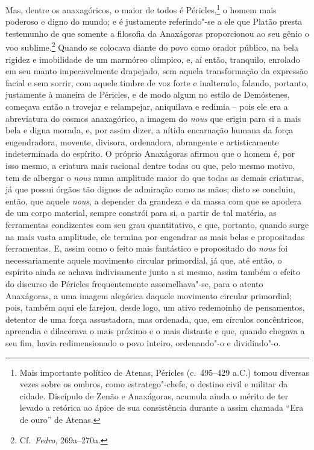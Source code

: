 Mas, dentre os anaxagóricos, o maior de todos é Péricles,\footnote{ Mais
importante político de Atenas, Péricles (c.~495--429 a.C.) tomou
diversas vezes sobre os ombros, como estratego"-chefe, o destino civil e
militar da cidade. Discípulo de Zenão e Anaxágoras, acumula ainda o
mérito de ter levado a retórica ao ápice de sua consistência durante a
assim chamada ``Era de ouro'' de Atenas.} o homem mais poderoso e
digno do mundo; e é justamente referindo"-se a ele que Platão presta
testemunho de que somente a filosofia da Anaxágoras proporcionou ao seu
gênio o voo sublime.\footnote{ Cf.~\textit{Fedro}, 269a--270a.} 
Quando se colocava diante do povo como orador público, na bela
rigidez e imobilidade de um marmóreo olímpico, e, aí então, tranquilo,
enrolado em seu manto impecavelmente drapejado, sem aquela
transformação da expressão facial e sem sorrir, com aquele timbre de
voz forte e inalterado, falando, portanto, justamente à maneira de
Péricles, e de modo algum no estilo de Demóstenes, começava então a
trovejar e relampejar, aniquilava e redimia -- pois ele era a
abreviatura do cosmos anaxagórico, a imagem do \textit{nous} que erigiu
para si a mais bela e digna morada, e, por assim dizer, a nítida
encarnação humana da força engendradora, movente, divisora, ordenadora,
abrangente e artisticamente indeterminada do espírito. O próprio
Anaxágoras afirmou que o homem é, por isso mesmo, a criatura mais
racional dentre todas ou que, pelo mesmo motivo, tem de albergar o
\textit{nous} numa amplitude maior do que todas as demais criaturas, já
que possui órgãos tão dignos de admiração como as mãos; disto se concluiu,
então, que aquele \textit{nous}, a depender da grandeza e da massa com
que se apodera de um corpo material, sempre constrói para si, a partir
de tal matéria, as ferramentas condizentes com seu grau quantitativo, e
que, portanto, quando surge na mais vasta amplitude, ele termina por
engendrar as mais belas e propositadas ferramentas. E, assim como o
feito mais fantástico e propositado do \textit{nous} foi
necessariamente aquele movimento circular primordial, já que, até
então, o espírito ainda se achava indivisamente junto a si mesmo, assim
também o efeito do discurso de Péricles frequentemente assemelhava"-se,
para o atento Anaxágoras, a uma imagem alegórica daquele movimento circular
primordial; pois, também aqui ele farejou, desde logo, um ativo
redemoinho de pensamentos, detentor de uma força assustadora, mas
ordenada, que, em círculos concêntricos, apreendia e dilacerava o mais
próximo e o mais distante e que, quando chegava a seu fim, havia
redimensionado o povo inteiro, ordenando"-o e dividindo"-o.

